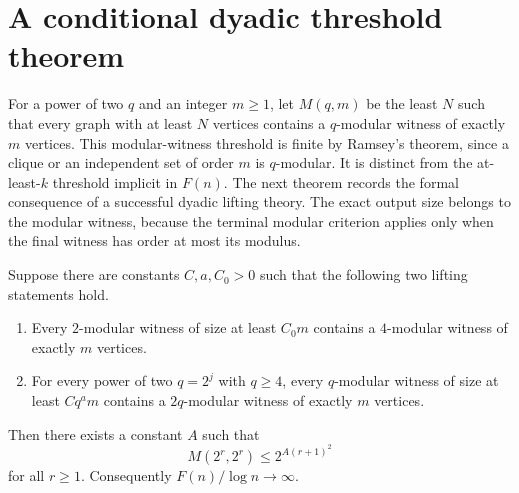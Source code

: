 \documentclass[thmsec,dntnbr,nolinenbrs]{dmgt}
\numberwithin{equation}{section}
\begin{document}
\section{A conditional dyadic threshold theorem}

For a power of two \(q\) and an integer \(m\ge 1\), let \(M(q,m)\) be the least \(N\) such that every graph with at least \(N\) vertices contains a \(q\)-modular witness of exactly \(m\) vertices.  This modular-witness threshold is finite by Ramsey's theorem, since a clique or an independent set of order \(m\) is \(q\)-modular.  It is distinct from the at-least-\(k\) threshold implicit in \(F(n)\).  The next theorem records the formal consequence of a successful dyadic lifting theory.  The exact output size belongs to the modular witness, because the terminal modular criterion applies only when the final witness has order at most its modulus.

\begin{theorem}\label{thm:conditional-threshold}\mbox{}\par\nobreak
Suppose there are constants \(C,a,C_0>0\) such that the following two lifting statements hold.
\begin{enumerate}[label=\textup{(\arabic*)}, leftmargin=*]
    \item Every \(2\)-modular witness of size at least \(C_0m\) contains a \(4\)-modular witness of exactly \(m\) vertices.
    \item For every power of two \(q=2^j\) with \(q\ge 4\), every \(q\)-modular witness of size at least \(Cq^a m\) contains a \(2q\)-modular witness of exactly \(m\) vertices.
\end{enumerate}
Then there exists a constant \(A\) such that
\[
        M(2^r,2^r)\le 2^{A(r+1)^2}
\]
for all \(r\ge 1\).  Consequently \(F(n)/\log n\to\infty\).
\end{theorem}
\end{document}
